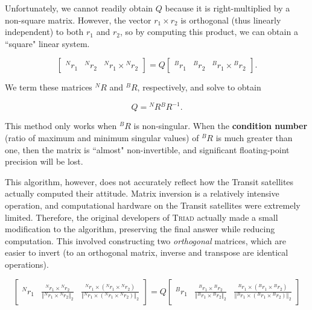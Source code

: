 \documentclass[12pt]{article}
\begin{document}
	Unfortunately, we cannot readily obtain \( Q \) because it is right-multiplied by a non-square matrix.  However, the vector \( r_1 \times r_2 \) is orthogonal (thus linearly independent) to both \( r_1 \) and \( r_2 \), so by computing this product, we can obtain a ``square" linear system.
	
	\begin{equation*}
		\begin{bmatrix}
			{}^N r_1 & {}^N r_2 & {}^N r_1 \times {}^N r_2
		\end{bmatrix}
		=
		Q
		\begin{bmatrix}
			{}^B r_1 & {}^B r_2 & {}^B r_1 \times {}^B r_2 
		\end{bmatrix} .
	\end{equation*}
	
	We term these matrices \( {}^N R \) and \( {}^B R \), respectively, and solve to obtain
	
	\begin{equation}
		\boxed{ Q = {}^N R {}^B R^{-1} } .
	\end{equation}
	
	This method only works when \( {}^B R \) is non-singular.  When the \textbf{condition number} (ratio of maximum and minimum singular values) of \( {}^B R \) is much greater than one, then the matrix is ``almost" non-invertible, and significant floating-point precision will be lost.
	
	This algorithm, however, does not accurately reflect how the Transit satellites actually computed their attitude.  Matrix inversion is a relatively intensive operation, and computational hardware on the Transit satellites were extremely limited.  Therefore, the original developers of \textsc{Triad} actually made a small modification to the algorithm, preserving the final answer while reducing computation.  This involved constructing two \textit{orthogonal} matrices, which are easier to invert (to an orthogonal matrix, inverse and transpose are identical operations).
	
	\begin{equation*}
		\begin{bmatrix}
			{}^N r_1 & \frac{{}^N r_1 \times {}^N r_2}{\left\Vert {}^N r_1 \times {}^N r_2 \right\Vert_2} & \frac{{}^N r_1 \times \left( {}^N r_1 \times {}^N r_2 \right)}{\left\Vert {}^N r_1 \times \left( {}^N r_1 \times {}^N r_2 \right) \right\Vert_2}
		\end{bmatrix}
		=
		Q
		\begin{bmatrix}
			{}^B r_1 & \frac{{}^B r_1 \times {}^B r_2}{\left\Vert {}^B r_1 \times {}^B r_2 \right\Vert_2} & \frac{{}^B r_1 \times \left( {}^B r_1 \times {}^B r_2 \right)}{\left\Vert {}^B r_1 \times \left( {}^B r_1 \times {}^B r_2 \right) \right\Vert_2}
		\end{bmatrix}
	\end{equation*}
	
\end{document}
